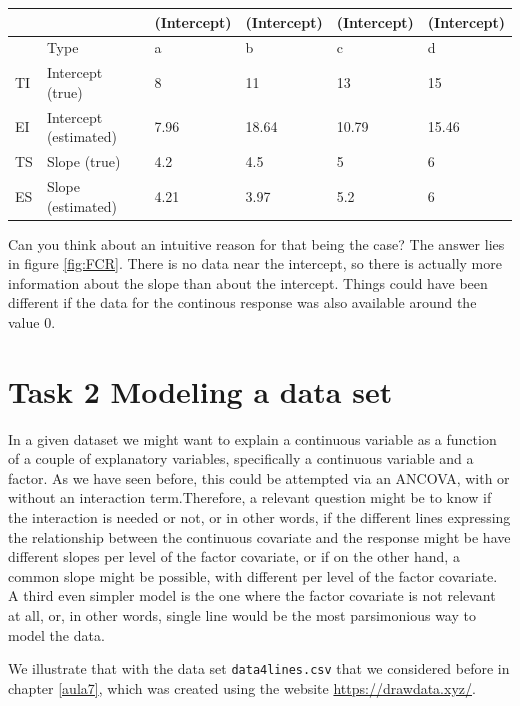 \documentclass[
]{book}
\begin{document}
\begin{tabular}{l|l|l|l|l|l}
\hline
  &  & (Intercept) & (Intercept) & (Intercept) & (Intercept)\\
\hline
 & Type & a & b & c & d\\
\hline
TI & Intercept (true) & 8 & 11 & 13 & 15\\
\hline
EI & Intercept (estimated) & 7.96 & 18.64 & 10.79 & 15.46\\
\hline
TS & Slope (true) & 4.2 & 4.5 & 5 & 6\\
\hline
ES & Slope (estimated) & 4.21 & 3.97 & 5.2 & 6\\
\hline
\end{tabular}

Can you think about an intuitive reason for that being the case? The answer lies in figure \ref{fig:FCR}. There is no data near the intercept, so there is actually more information about the slope than about the intercept. Things could have been different if the data for the continous response was also available around the value 0.

\hypertarget{task-2-modeling-a-data-set}{%
\section{Task 2 Modeling a data set}\label{task-2-modeling-a-data-set}}

In a given dataset we might want to explain a continuous variable as a function of a couple of explanatory variables, specifically a continuous variable and a factor. As we have seen before, this could be attempted via an ANCOVA, with or without an interaction term.Therefore, a relevant question might be to know if the interaction is needed or not, or in other words, if the different lines expressing the relationship between the continuous covariate and the response might be have different slopes per level of the factor covariate, or if on the other hand, a common slope might be possible, with different per level of the factor covariate. A third even simpler model is the one where the factor covariate is not relevant at all, or, in other words, single line would be the most parsimonious way to model the data.

We illustrate that with the data set \texttt{data4lines.csv} that we considered before in chapter \ref{aula7}, which was created using the website \url{https://drawdata.xyz/}.
\end{document}
